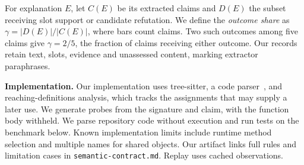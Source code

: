 For explanation $E$, let $C(E)$ be its extracted claims and $D(E)$ the subset receiving slot support or candidate refutation. We define the \emph{outcome share} as $\gamma=|D(E)|/|C(E)|$, where bars count claims. Two such outcomes among five claims give $\gamma=2/5$, the fraction of claims receiving either outcome. Our records retain text, slots, evidence and unassessed content, marking extractor paraphrases.

\noindent\textbf{Implementation.} Our implementation uses tree-sitter, a code parser~\cite{treesitter}, and reaching-definitions analysis, which tracks the assignments that may supply a later use. We generate probes from the signature and claim, with the function body withheld. We parse repository code without execution and run tests on the benchmark below. Known implementation limits include runtime method selection and multiple names for shared objects. Our artifact links full rules and \SuiteLim{} limitation cases in \texttt{semantic-contract.md}. Replay uses cached observations.
